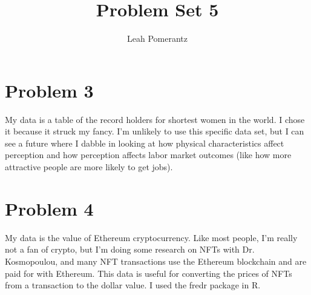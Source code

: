 \documentclass{article}
\title{Problem Set 5}
\author{Leah Pomerantz}
\begin{document}
\maketitle


\section{Problem 3}

My data is a table of the record holders for shortest women in the world. I chose it because it struck my fancy. I'm unlikely to use this specific data set, but I can see a future where I dabble in looking at how physical characteristics affect perception and how perception affects labor market outcomes (like how more attractive people are more likely to get jobs). 

\section{Problem 4}

My data is the value of Ethereum cryptocurrency. Like most people, I'm really not a fan of crypto, but I'm doing some research on NFTs with Dr. Kosmopoulou, and many NFT transactions use the Ethereum blockchain and are paid for with Ethereum. This data is useful for converting the prices of NFTs from a transaction to the dollar value. I used the fredr package in R.
\end{document}
